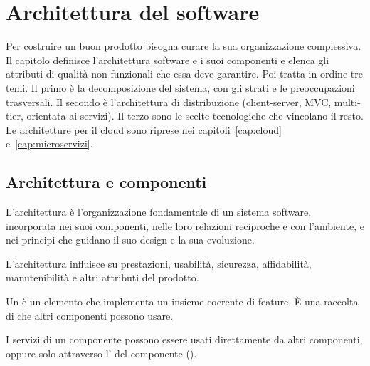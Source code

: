 \chapter{Architettura del software}
\label{cap:architettura}

\begin{inbreve}
Per costruire un buon prodotto bisogna curare la sua organizzazione complessiva. Il capitolo definisce
l'architettura software e i suoi componenti e elenca gli attributi di qualità non funzionali che essa deve
garantire. Poi tratta in ordine tre temi. Il primo è la decomposizione del sistema, con gli strati e le
preoccupazioni trasversali. Il secondo è l'architettura di distribuzione (client-server, MVC, multi-tier, orientata
ai servizi). Il terzo sono le scelte tecnologiche che vincolano il resto. Le architetture per il cloud sono riprese
nei capitoli~\ref{cap:cloud} e~\ref{cap:microservizi}.
\end{inbreve}

\section{Architettura e componenti}
\label{sec:arch-componenti}

\begin{definizione}
L'architettura è l'organizzazione fondamentale di un sistema software, incorporata nei suoi componenti, nelle loro
relazioni reciproche e con l'ambiente, e nei principi che guidano il suo design e la sua evoluzione.
\end{definizione}

L'architettura influisce su prestazioni, usabilità, sicurezza, affidabilità, manutenibilità e altri attributi del
prodotto.

\begin{definizione}[Component]
Un  è un elemento che implementa un insieme coerente di feature. È una raccolta di
 che altri componenti possono usare.
\end{definizione}

I servizi di un componente possono essere usati direttamente da altri componenti, oppure solo attraverso
l' del componente ().

